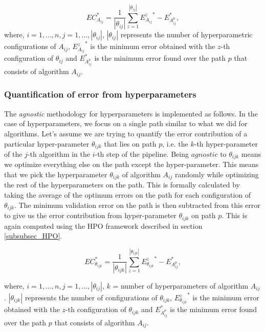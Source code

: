 \begin{equation}
\label{eq_alg}
EC_{A_{ij}}^* = \frac{1}{|\theta_{ij}|}\sum_{z=1}^{|\theta_{ij}|} {E_{A_{ij}}^z}^* - {E_{A_{ij}^p}^*},
\end{equation}
where, $i = {1, ..., n}, j = {1, ..., |\theta_{ij}|}$, $|\theta_{ij}|$ represents the number of hyperparametric configurations of $A_{ij}$,  ${E_{A_{ij}}^z}^*$ is the minimum error obtained with the $z$-th configuration of $\theta_{ij}$ and $E_{A_{ij}^p}^*$ is the minimum error found over the path $p$ that consists of algorithm $A_{ij}$.


\subsubsection{Quantification of error from hyperparameters}
\label{subsubsec_eq_hyper}
The \textit{agnostic} methodology for hyperparameters is implemented as follows. In the case of hyperparameters, we focus on a single path similar to what we did for algorithms. Let's assume we are trying to quantify the error contribution of a particular hyper-parameter $\theta_{ijk}$ that lies on path $p$, i.e. the $k$-th hyper-parameter of the $j$-th algorithm in the $i$-th step of the pipeline. Being $agnostic$ to $\theta_{ijk}$ means we optimize everything else on the path except the hyper-parameter. This means that we pick the hyperparameter $\theta_{ijk}$ of algorithm $A_{ij}$ randomly while optimizing the rest of the hyperparameters on the path. This is formally calculated by taking the average of the optimum errors on the path for each configuration of $\theta_{ijk}$. The minimum validation error on the path is then subtracted from this error to give us the error contribution from hyper-parameter $\theta_{ijk}$ on path $p$. This is again computed using the HPO framework described in section \ref{subsubsec_HPO}.

\begin{equation}
\label{eq_hyper}
EC_{\theta_{ijk}}^* = \frac{1}{|\theta_{ijk}|}\sum_{z=1}^{|\theta_{ijk}|} {E_{\theta_{ijk}}^z}^* - {E_{A_{ij}^p}^*},
\end{equation}

where, $i = {1, ..., n}, j = {1, ..., |\theta_{ij}|}$, $k$ = number of hyperparameters of algorithm $A_{ij}$. $|\theta_{ijk}|$ represents the number of configurations of $\theta_{ijk}$,  ${E_{\theta_{ijk}}^z}^*$ is the minimum error obtained with the $z$-th configuration of $\theta_{ijk}$ and $E_{A_{ij}^p}^*$ is the minimum error found over the path $p$ that consists of algorithm $A_{ij}$.


